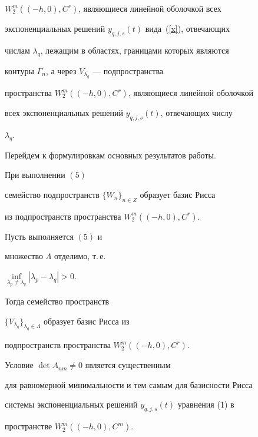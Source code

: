 $W_2^m((-h,0),C^r)$, являющиеся линейной оболочкой всех


экспоненциальных решений $y_{q,j,s}(t)$ вида~(\ref{x}), отвечающих


числам $\lambda_q$, лежащим в областях, границами которых являются


контуры $\Gamma_n$, а через $V_{\lambda_q}$ --- подпространства


пространства $W_2^m((-h,0),C^r)$, являющиеся линейной оболочкой


всех экспоненциальных решений $y_{q,j,s}(t)$, отвечающих числу


$\lambda_q$.





Перейдем к формулировкам основных результатов работы.





\begin{thm}


При выполнении $(5)$ 


семейство подпространств $\{W_n\}_{n\in Z}$ образует базис Рисса


из подпространств пространства $W_2^m((-h,0),C^r)$.


\end{thm}





\begin{thm}


Пусть выполняется $(5)$ и


множество $\Lambda$ отделимо, т.\,е.


$\inf\limits_{\lambda_p\ne\lambda_q}|\lambda_p-\lambda_q|>0$.


Тогда семейство пространств


$\{V_{\lambda_q}\}_{\lambda_q\in\Lambda}$ образует базис Рисса из


подпространств пространства $W_2^m((-h,0),C^r)$.


\end{thm}





\begin{note}


Условие $\det A_{nm}\ne0$ является существенным


для равномерной минимальности и тем самым для базисности Рисса


системы экспоненциальных решений $y_{q,j,s}(t)$ уравнения (1) в


пространстве $W_2^m((-h,0),C^m)$.


\end{note}





